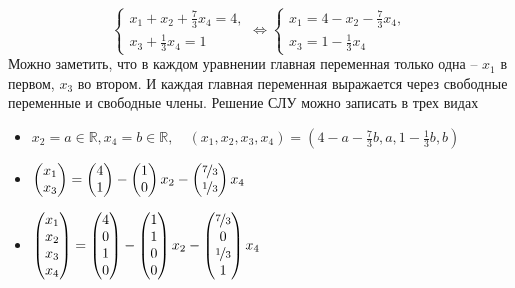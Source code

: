 \documentclass[10pt, a4paper]{extarticle}
\def \R{\mathbb{R}}
\theoremstyle{definition}
\begin{document}
 \[
    \begin{cases}
        x_1 + x_2 + \frac{7}{3} x_4 = 4, \\
        x_3 + \frac{1}{3}x_4 = 1
    \end{cases}  
    \iff
    \begin{cases}
        x_1 = 4 - x_2 - \frac{7}{3} x_4, \\
        x_3 = 1 - \frac{1}{3}x_4
    \end{cases} 
 \]
 Можно заметить, что в каждом уравнении главная переменная только одна -- $x_1$ в первом, $x_3$ во втором. И каждая главная переменная выражается
 через свободные переменные и свободные члены. Решение СЛУ можно записать в трех видах
 \begin{itemize}
    \item $x_2 = a \in \R, x_4 = b\in \R, \quad
       \left(x_1, x_2, x_3, x_4\right) = \left(4 - a - \tfrac{7}{3} b, a, 1 - \tfrac{1}{3}b, b\right)$
    \item 
    $
        \begin{pmatrix}
        x_1 \\ x_3
        \end{pmatrix} = 
        \begin{pmatrix}
        4 \\ 1
        \end{pmatrix} - 
        \begin{pmatrix}
        1 \\ 0
        \end{pmatrix}x_2 - 
        \begin{pmatrix}
        \nicefrac{7}{3} \\ \nicefrac{1}{3}
        \end{pmatrix}x_4
    $
    \item 
    $
    \begin{pmatrix}
        x_1 \\ x_2 \\ x_3 \\ x_4
    \end{pmatrix} = 
    \begin{pmatrix}
        4 \\ 0 \\ 1 \\ 0
    \end{pmatrix} - 
    \begin{pmatrix}
        1 \\ 1 \\ 0 \\ 0
    \end{pmatrix}x_2 - 
    \begin{pmatrix}
        \nicefrac{7}{3} \\ 0 \\ \nicefrac{1}{3} \\ 1
    \end{pmatrix}x_4
    $
 \end{itemize}
 
\end{document}
